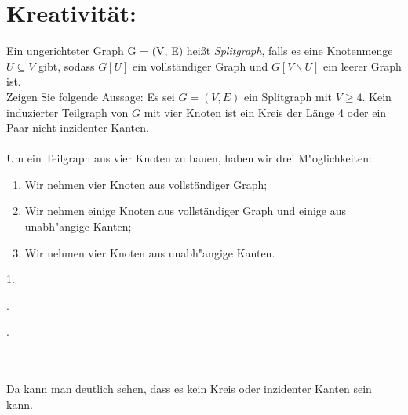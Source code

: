     \section*{Kreativität:}
    Ein ungerichteter Graph G = (V, E) heißt \textit{Splitgraph}, falls es eine Knotenmenge $U\subseteq V$ gibt,
	sodass $G[U]$ ein vollständiger Graph und $G[V\backslash U]$ ein leerer Graph ist.\\
	Zeigen Sie folgende Aussage:
	Es sei $G = (V, E)$ ein Splitgraph mit $V\geq 4$. Kein induzierter Teilgraph von $G$
	mit vier Knoten ist ein Kreis der Länge 4 oder ein Paar nicht inzidenter Kanten.\\\\
	Um ein Teilgraph aus vier Knoten zu bauen, haben wir drei M"oglichkeiten:
	\begin{enumerate}
		\item Wir nehmen vier Knoten aus vollständiger Graph;
		\item Wir nehmen einige Knoten aus vollständiger Graph und einige aus unabh"angige Kanten;
		\item Wir nehmen vier Knoten aus unabh"angige Kanten.
	\end{enumerate}
	1. 
    .
    .
    \\\\
    Da kann man deutlich sehen, dass es kein Kreis oder inzidenter Kanten sein kann. 

